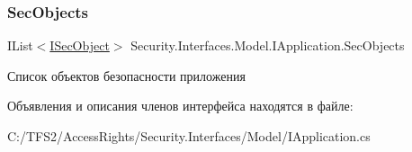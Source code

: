 \subsubsection{\texorpdfstring{Sec\+Objects}{SecObjects}}
{\footnotesize\ttfamily I\+List$<$\hyperlink{interface_security_1_1_interfaces_1_1_model_1_1_i_sec_object}{I\+Sec\+Object}$>$ Security.\+Interfaces.\+Model.\+I\+Application.\+Sec\+Objects\hspace{0.3cm}{\ttfamily [get]}}



Список объектов безопасности приложения 



Объявления и описания членов интерфейса находятся в файле\+:\begin{DoxyCompactItemize}
\item 
C\+:/\+T\+F\+S2/\+Access\+Rights/\+Security.\+Interfaces/\+Model/I\+Application.\+cs\end{DoxyCompactItemize}
